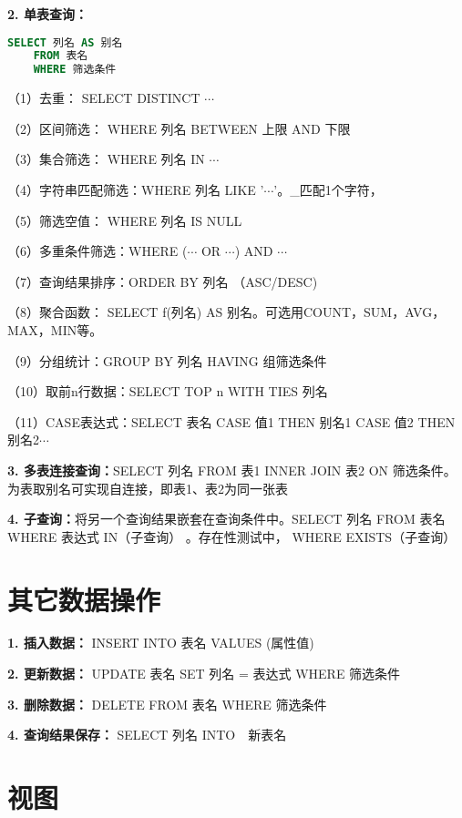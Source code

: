 \textbf{2. 单表查询：}
\begin{lstlisting}[language=SQL]
    SELECT 列名 AS 别名  
    FROM 表名 
    WHERE 筛选条件    
\end{lstlisting}

\quad（1）去重： SELECT DISTINCT $\cdots$

\quad（2）区间筛选： WHERE 列名 BETWEEN 上限 AND 下限

\quad（3）集合筛选： WHERE 列名 IN {$\cdots$}

\quad（4）字符串匹配筛选：WHERE 列名 LIKE '$\cdots$'。\_匹配1个字符，%

\quad（5）筛选空值： WHERE 列名 IS NULL

\quad（6）多重条件筛选：WHERE ($\cdots$ OR $\cdots$) AND $\cdots$

\quad（7）查询结果排序：ORDER BY 列名 （ASC/DESC)

\quad（8）聚合函数： SELECT f(列名) AS 别名。可选用COUNT，SUM，AVG，MAX，MIN等。

\quad（9）分组统计：GROUP BY 列名 HAVING 组筛选条件

\quad（10）取前n行数据：SELECT TOP n {WITH TIES} 列名

\quad（11）CASE表达式：SELECT 表名 CASE 值1 THEN 别名1 CASE 值2 THEN 别名2$\cdots$

\textbf{3. 多表连接查询：}SELECT 列名 FROM 表1 INNER JOIN 表2 ON 筛选条件。为表取别名可实现自连接，即表1、表2为同一张表

\textbf{4. 子查询：}将另一个查询结果嵌套在查询条件中。SELECT 列名 FROM 表名 WHERE 表达式 IN（子查询） 。存在性测试中， WHERE EXISTS（子查询）

\section{其它数据操作}

\textbf{1. 插入数据：} INSERT INTO 表名 VALUES (属性值)

\textbf{2. 更新数据：} UPDATE 表名 SET 列名 = 表达式 {WHERE 筛选条件}

\textbf{3. 删除数据：} DELETE FROM 表名 {WHERE  筛选条件}

\textbf{4. 查询结果保存：} SELECT 列名 INTO　新表名

\section{视图}

